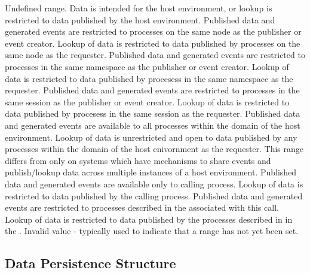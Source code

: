\begin{constantdesc}
%
Undefined range.
%
Data is intended for the host environment, or lookup is restricted to data published by the host environment.
%
Published data and generated events are restricted to processes on the same node as the publisher or event creator.  Lookup of data is restricted to data published by processes on the same node as the requester.
%
Published data and generated events are restricted to processes in the same namespace as the publisher or event creator.
Lookup of data is restricted to data published by procesess in the same namespace as the requester.
%
Published data and generated events are restricted to processes in the same session as the publisher or event creator.
Lookup of data is restricted to data published by procesess in the same session as the requester.
%
Published data and generated events are available to all processes within the domain of the host environment.
Lookup of data is unrestricted and open to data published by any processes within the domain of the host enivornment as the requester.  This range differs from  only on systems which have mechanisms to share events and
publish/lookup data across multiple instances of a host environment.
%
Published data and generated events are available only to calling process.
Lookup of data is restricted to data published by the calling process.
%
Published data and generated events are restricted to processes
described in the  associated with this call.
Lookup of data is restricted to data published by the processes described in
in the .
%
Invalid value - typically used to indicate that a range has not yet been set.
%
\end{constantdesc}


\subsection{Data Persistence Structure}
\label{chap:pub:types:persist}

